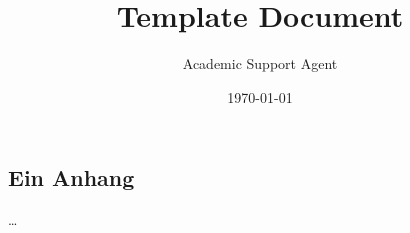 \documentclass{article}
\title{Template Document}
\author{Academic Support Agent}
\date{\today}
\begin{document}
\maketitle



	\begin{appendix}
		\chapter{Ein Anhang}
		\dots{}
	\end{appendix}
\end{document}
